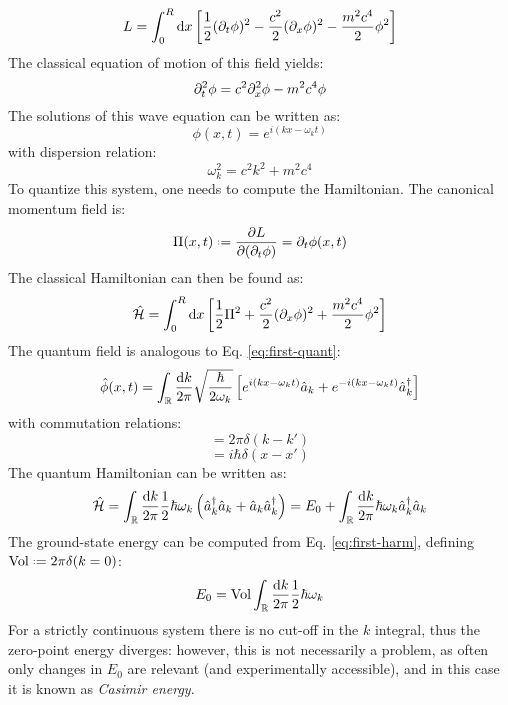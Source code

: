 \begin{equation}
  L = \int_0^R \mathrm{d} x \left[ \frac{1}{2} (\partial_t \phi)^2 - \frac{c^2}{2} (\partial_x \phi)^2 - \frac{m^2 c^4}{2} \phi^2 \right]
\end{equation}
The classical equation of motion of this field yields:
\begin{equation}
  \partial_t^2 \phi = c^2 \partial_x^2 \phi - m^2 c^4 \phi
\end{equation}
The solutions of this wave equation can be written as:
\begin{equation}
  \phi(x,t) = e^{i \left( kx - \omega_k t \right)}
\end{equation}
with dispersion relation:
\begin{equation}
  \omega_k^2 = c^2 k^2 + m^2 c^4
\end{equation}
To quantize this system, one needs to compute the Hamiltonian. The canonical momentum field is:
\begin{equation}
  \Pi(x,t) \defeq \frac{\pa L}{\pa (\pa_t \phi)} = \pa_t \phi(x,t)
\end{equation}
The classical Hamiltonian can then be found as:
\begin{equation}
  \hat{\mathcal{H}} = \int_0^R \mathrm{d} x \left[ \frac{1}{2} \Pi^2 + \frac{c^2}{2} (\partial_x \phi)^2 + \frac{m^2 c^4}{2} \phi^2 \right]
\end{equation}
The quantum field is analogous to Eq. \ref{eq:first-quant}:
\begin{equation}
  \hat\phi(x,t) = \int_{\mathbb{R}} \frac{\mathrm{d} k}{2\pi} \sqrt{\frac{\hbar}{2\omega_k}} \left[ e^{i \left( kx - \omega_k t \right)} \hat{a}_k + e^{-i \left( kx - \omega_k t \right)} \hat{a}_k^\dagger \right]
\end{equation}
with commutation relations:
\begin{equation}
  [\hat{a}_k, \hat{a}_{k'}^\dagger] = 2\pi \delta(k - k')
\end{equation}
\begin{equation}
  [\hat\phi(x,t), \hat\Pi(x',t)] = i\hbar \delta(x - x')
\end{equation}
The quantum Hamiltonian can be written as:
\begin{equation}
  \hat{\mathcal{H}} = \int_{\mathbb{R}} \frac{\mathrm{d} k}{2\pi} \frac{1}{2} \hbar \omega_k \left( \hat{a}_k^\dagger \hat{a}_k + \hat{a}_k \hat{a}_k^\dagger \right) = E_0 + \int_{\mathbb{R}} \frac{\mathrm{d} k}{2\pi} \hbar \omega_k \hat{a}_k^\dagger \hat{a}_k
\end{equation}
The ground-state energy can be computed from Eq. \ref{eq:first-harm}, defining $ \mathrm{Vol} \defeq 2\pi \delta(k = 0) $:
\begin{equation}
  E_0 = \mathrm{Vol} \int_{\mathbb{R}} \frac{\mathrm{d} k}{2\pi} \frac{1}{2} \hbar \omega_k
\end{equation}
For a strictly continuous system there is no cut-off in the $ k $ integral, thus the zero-point energy diverges: however, this is not necessarily a problem, as often only changes in $ E_0 $ are relevant (and experimentally accessible), and in this case it is known as \textit{Casimir energy}.

